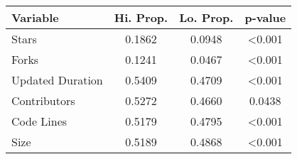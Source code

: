\begin{tabular}{|l|c|c|c|}
\hline
Variable & Hi. Prop. & Lo. Prop. & p-value \\
\hline \hline
Stars & 0.1862 & 0.0948 & \textless{}0.001 \\
Forks & 0.1241 & 0.0467 & \textless{}0.001 \\
Updated Duration & 0.5409 & 0.4709 & \textless{}0.001 \\
Contributors & 0.5272 & 0.4660 & 0.0438 \\
Code Lines & 0.5179 & 0.4795 & \textless{}0.001 \\
Size & 0.5189 & 0.4868 & \textless{}0.001 \\
\hline
\end{tabular}